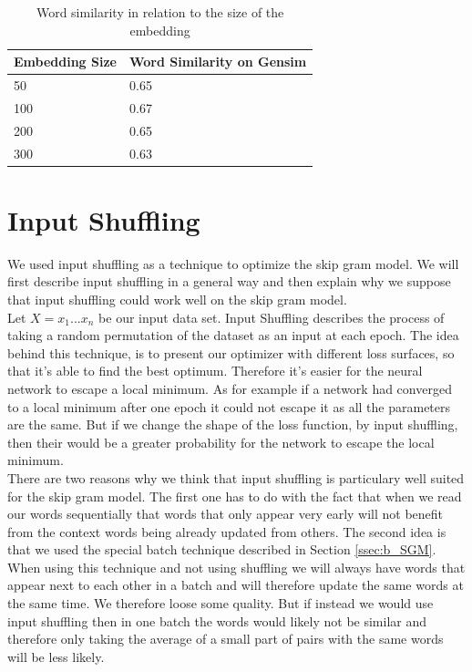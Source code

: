 \begin{table}[h]
\centering
\begin{tabular}{|l|l|}
\hline
Embedding Size & Word Similarity on Gensim \\ \hline
50 & 0.65 \\ \hline
100 & 0.67 \\ \hline
200 & 0.65 \\ \hline
300 & 0.63 \\ \hline
\end{tabular}
\caption{Word similarity in relation to the size of the embedding}
\label{table:gensim_emb_size}
\end{table}

\section{Input Shuffling}
We used input shuffling as a technique to optimize the skip gram model. We will first describe input shuffling in a general way and then explain why we suppose that input shuffling could work well on the skip gram model. \\
Let $X = {x_1...x_n}$ be our input data set. Input Shuffling describes the process of taking a random permutation of the dataset as an input at each epoch. 
The idea behind this technique, is  to present our optimizer with different loss surfaces, so that it's able to find the best optimum. Therefore it's easier for the neural network to escape a local minimum. As for example if a network had converged to a local minimum after one epoch it could not escape it as all the parameters are the same. But if we change the shape of the loss function, by input shuffling, then their would be a greater probability for the network to escape the local minimum.
\\
There are two reasons why we think that input shuffling is particulary well suited for the skip gram model. The first one has to do with the fact that when we read our words sequentially that words that only appear very early will not benefit from the context words being already updated from others. The second idea is that we used the special batch technique described in Section \ref{ssec:b_SGM}. When using this technique and not using shuffling we will always have words that appear next to each other in a batch and will therefore update the same words at the same time. We therefore loose some quality. But if instead we would use input shuffling then in one batch the words would likely not be similar and therefore only taking the average of a small part of pairs with the same words will be less likely. 


